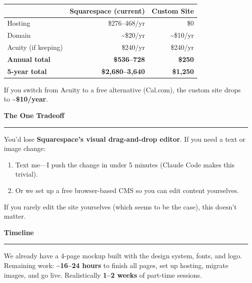 \documentclass[10pt,letterpaper]{article}
\newcommand{\sectionhead}[1]{%
  \vspace{10pt}%
  {\headingfont\Large\bfseries #1}\\[-3pt]%
  {\color{wwsAccent}\rule{\linewidth}{1.5pt}}%
  \vspace{2pt}%
}
\begin{document}
\begin{tabularx}{\linewidth}{@{}X r r@{}}
\toprule
& \textbf{Squarespace (current)} & \textbf{Custom Site} \\
\midrule
Hosting & \$276--468/yr & \$0 \\
Domain & \textasciitilde\$20/yr & \textasciitilde\$10/yr \\
Acuity (if keeping) & \$240/yr & \$240/yr \\
\midrule
\textbf{Annual total} & \textbf{\$536--728} & \textbf{\$250} \\
\textbf{5-year total} & \textbf{\$2,680--3,640} & \textbf{\$1,250} \\
\bottomrule
\end{tabularx}

\vspace{4pt}
If you switch from Acuity to a free alternative (Cal.com), the custom site drops to \textbf{\textasciitilde\$10/year}.

\sectionhead{The One Tradeoff}

You'd lose \textbf{Squarespace's visual drag-and-drop editor}. If you need a text or image change:

\begin{enumerate}[nosep, leftmargin=1.5em]
\item Text me---I push the change in under 5 minutes (Claude Code makes this trivial).
\item Or we set up a free browser-based CMS so you can edit content yourselves.
\end{enumerate}

If you rarely edit the site yourselves (which seems to be the case), this doesn't matter.

\sectionhead{Timeline}

We already have a 4-page mockup built with the design system, fonts, and logo. Remaining work: \textbf{\textasciitilde16--24 hours} to finish all pages, set up hosting, migrate images, and go live. Realistically \textbf{1--2 weeks} of part-time sessions.

\vspace{6pt}
\end{document}
